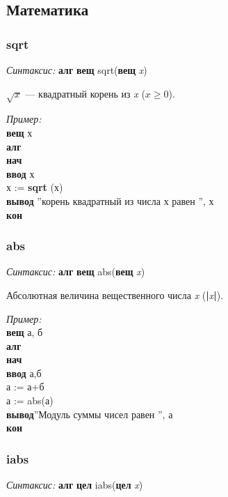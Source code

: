 \normalfont

\subsection{Математика}

\normalfont
\subsubsection{sqrt}

\emph{Синтаксис:} \textbf{алг} \textbf{вещ} sqrt(\textbf{вещ} \emph{x})


      $\sqrt{x}$ --- квадратный корень из \emph{x} ($x \ge 0$).

\emph{Пример:}  
\sffamily
~\\\textbf{вещ} х
~\\\textbf{алг 
~\\нач
~\\\otstup ввод} х
~\\\otstup х := \textbf{sqrt} (х)
~\\\otstup \textbf{вывод} ''корень квадратный из числа х равен '', х
~\\\textbf{кон}


\normalfont
\subsubsection{abs}

\emph{Синтаксис:} \textbf{алг} \textbf{вещ} abs(\textbf{вещ} \emph{x})


      Абсолютная величина вещественного числа \emph{x} (\textbf{|}\emph{x}\textbf{|}).

\emph{Пример:}
\sffamily
~\\\textbf{вещ} а, б
~\\\textbf{алг 
~\\нач
~\\\otstup ввод} а,б
~\\\otstup а := а+б
~\\\otstup а := abs(а)
~\\\otstup \textbf{вывод}''Модуль суммы чисел равен '', а
~\\\textbf{кон}

\normalfont
\subsubsection{iabs}

\emph{Синтаксис:} \textbf{алг} \textbf{цел} iabs(\textbf{цел} \emph{x})


